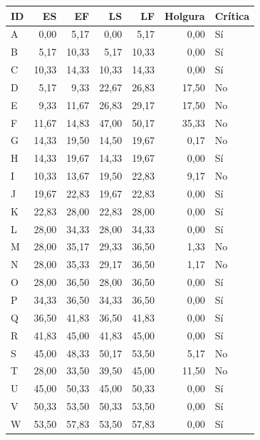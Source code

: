 \begin{tabular}{lrrrrrl}\toprule ID & ES & EF & LS & LF & Holgura & Crítica \\ \midrule
A & 0,00 & 5,17 & 0,00 & 5,17 & 0,00 & Sí \\
B & 5,17 & 10,33 & 5,17 & 10,33 & 0,00 & Sí \\
C & 10,33 & 14,33 & 10,33 & 14,33 & 0,00 & Sí \\
D & 5,17 & 9,33 & 22,67 & 26,83 & 17,50 & No \\
E & 9,33 & 11,67 & 26,83 & 29,17 & 17,50 & No \\
F & 11,67 & 14,83 & 47,00 & 50,17 & 35,33 & No \\
G & 14,33 & 19,50 & 14,50 & 19,67 & 0,17 & No \\
H & 14,33 & 19,67 & 14,33 & 19,67 & 0,00 & Sí \\
I & 10,33 & 13,67 & 19,50 & 22,83 & 9,17 & No \\
J & 19,67 & 22,83 & 19,67 & 22,83 & 0,00 & Sí \\
K & 22,83 & 28,00 & 22,83 & 28,00 & 0,00 & Sí \\
L & 28,00 & 34,33 & 28,00 & 34,33 & 0,00 & Sí \\
M & 28,00 & 35,17 & 29,33 & 36,50 & 1,33 & No \\
N & 28,00 & 35,33 & 29,17 & 36,50 & 1,17 & No \\
O & 28,00 & 36,50 & 28,00 & 36,50 & 0,00 & Sí \\
P & 34,33 & 36,50 & 34,33 & 36,50 & 0,00 & Sí \\
Q & 36,50 & 41,83 & 36,50 & 41,83 & 0,00 & Sí \\
R & 41,83 & 45,00 & 41,83 & 45,00 & 0,00 & Sí \\
S & 45,00 & 48,33 & 50,17 & 53,50 & 5,17 & No \\
T & 28,00 & 33,50 & 39,50 & 45,00 & 11,50 & No \\
U & 45,00 & 50,33 & 45,00 & 50,33 & 0,00 & Sí \\
V & 50,33 & 53,50 & 50,33 & 53,50 & 0,00 & Sí \\
W & 53,50 & 57,83 & 53,50 & 57,83 & 0,00 & Sí \\
\bottomrule\end{tabular}
